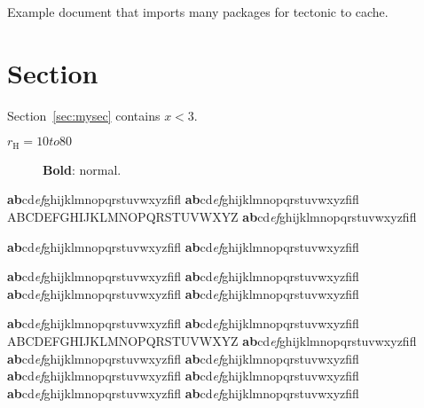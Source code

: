 \documentclass[a4paper,twoside,11pt]{article}
\begin{document}

\setcounter{tocdepth}{2}
\tableofcontents
\cleardoublepage

Example document that imports many packages for tectonic to cache.

\section{Section}{}\label{sec:mysec}
Section~\ref{sec:mysec} contains $x < 3$.

$r_\textrm{H}=10 to 80$

\begin{sidewaysfigure}[ht]
  \centering
  \caption{\textbf{Bold}: normal.}
  \label{fig:myfig}
\end{sidewaysfigure}

\normalsize

\textbf{ab}cd\textit{ef}ghijklmnopqrstuvwxyzfifl \fontname\font
{\selectfont \textbf{ab}cd\textit{ef}ghijklmnopqrstuvwxyzfifl \fontname\font}
{\selectfont ABCDEFGHIJKLMNOPQRSTUVWXYZ \fontname\font}
{\selectfont \textbf{ab}cd\textit{ef}ghijklmnopqrstuvwxyzfifl \fontname\font}

{\selectfont \textbf{ab}cd\textit{ef}ghijklmnopqrstuvwxyzfifl \fontname\font}
{\selectfont \textbf{ab}cd\textit{ef}ghijklmnopqrstuvwxyzfifl \fontname\font}

{\selectfont \textbf{ab}cd\textit{ef}ghijklmnopqrstuvwxyzfifl \fontname\font}
{\selectfont \textbf{ab}cd\textit{ef}ghijklmnopqrstuvwxyzfifl \fontname\font}
{\selectfont \textbf{ab}cd\textit{ef}ghijklmnopqrstuvwxyzfifl \fontname\font}
{\selectfont \textbf{ab}cd\textit{ef}ghijklmnopqrstuvwxyzfifl \fontname\font}

\large

\textbf{ab}cd\textit{ef}ghijklmnopqrstuvwxyzfifl \fontname\font
{\selectfont \textbf{ab}cd\textit{ef}ghijklmnopqrstuvwxyzfifl \fontname\font}
{\selectfont ABCDEFGHIJKLMNOPQRSTUVWXYZ \fontname\font}
{\selectfont \textbf{ab}cd\textit{ef}ghijklmnopqrstuvwxyzfifl \fontname\font}
{\selectfont \textbf{ab}cd\textit{ef}ghijklmnopqrstuvwxyzfifl \fontname\font}
{\selectfont \textbf{ab}cd\textit{ef}ghijklmnopqrstuvwxyzfifl \fontname\font}
{\selectfont \textbf{ab}cd\textit{ef}ghijklmnopqrstuvwxyzfifl \fontname\font}
{\selectfont \textbf{ab}cd\textit{ef}ghijklmnopqrstuvwxyzfifl \fontname\font}
{\selectfont \textbf{ab}cd\textit{ef}ghijklmnopqrstuvwxyzfifl \fontname\font}
{\selectfont \textbf{ab}cd\textit{ef}ghijklmnopqrstuvwxyzfifl \fontname\font}
\end{document}
